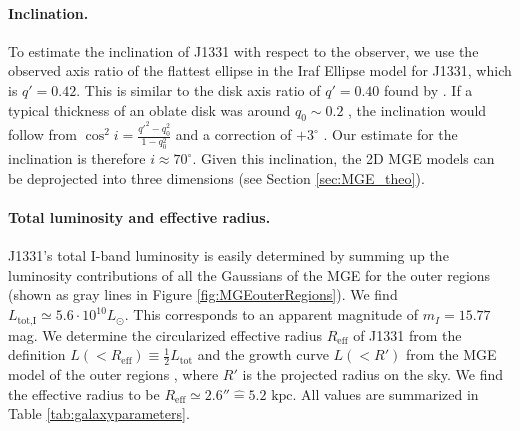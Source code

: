 \paragraph{Inclination.} To estimate the inclination of J1331 with respect to the observer, we use the observed axis ratio of the flattest ellipse in the Iraf Ellipse \Wilma{[TO DO]} model for J1331, which is $q'=0.42$. This is similar to the disk axis ratio of $q' = 0.40$ found by \citet{SWELLSI}. If a typical thickness of an oblate disk was around $q_0 \sim 0.2$ \citep{1958MeLu2.136....1H}, the inclination would follow from $\cos^2 i = \frac{q'^2 - q_0^2}{1 - q_0^2}$ and a correction of $+3^\circ$ \citep{1988ngc..book.....T}. Our estimate for the inclination is therefore $i \approx 70^\circ$. Given this inclination, the 2D MGE models can be deprojected into three dimensions (see Section \ref{sec:MGE_theo}).

\paragraph{Total luminosity and effective radius.} J1331's total I-band luminosity is easily determined by summing up the luminosity contributions of all the Gaussians of the MGE for the outer regions (shown as gray lines in Figure \ref{fig:MGEouterRegions}). We find $L_\text{tot,I} \simeq 5.6 \cdot 10^{10} L_\odot$. This corresponds to an apparent magnitude of $m_I = 15.77$ mag. We determine the circularized effective radius $R_\text{eff}$ of J1331 from the definition $L(<R_\text{eff}) \equiv \frac 12 L_\text{tot}$ and the growth curve $L(<R')$ from the MGE model of the outer regions , where $R'$ is the projected radius on the sky. We find the effective radius to be $R_\text{eff} \simeq 2.6'' \hat{=} 5.2 \text{ kpc}$.  All values are summarized in Table \ref{tab:galaxyparameters}.



